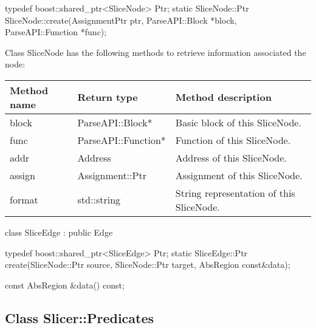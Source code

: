 \begin{apient}
typedef boost::shared_ptr<SliceNode> Ptr;      
static SliceNode::Ptr SliceNode::create(AssignmentPtr ptr,
                                        ParseAPI::Block *block,
                                        ParseAPI::Function *func);
\end{apient}

Class SliceNode has the following methods to retrieve information associated the
node:

\begin{tabular}{p{1.25in}p{1.125in}p{3.125in}}
\toprule
Method name & Return type & Method description \\
\midrule
block & ParseAPI::Block* & Basic block of this SliceNode. \\
func & ParseAPI::Function* & Function of this SliceNode. \\
addr & Address & Address of this SliceNode. \\
assign & Assignment::Ptr & Assignment of this SliceNode. \\
format & std::string & String representation of this SliceNode.\\
\bottomrule
\end{tabular}


\begin{apient}
class SliceEdge : public Edge 
\end{apient}

\begin{apient}
typedef boost::shared_ptr<SliceEdge> Ptr;
static SliceEdge::Ptr create(SliceNode::Ptr source,
                             SliceNode::Ptr target,
                             AbsRegion const&data);
\end{apient}

\begin{apient}
const AbsRegion &data() const;
\end{apient}


\subsection{Class Slicer::Predicates}
\label{sec:slicing}

